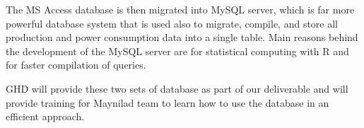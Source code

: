 The MS Access database is then migrated into MySQL server, which is far more powerful database system that is used also to migrate, compile, and store all production and power consumption data into a single table. Main reasons behind the development of the MySQL server are for statistical computing with R and for faster compilation of queries.

GHD will provide these two sets of database as part of our deliverable and will provide training for Maynilad team to learn how to use the database in an efficient approach.




